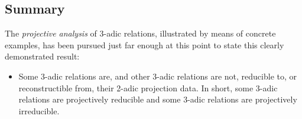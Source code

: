 \documentclass[12pt]{article}
\begin{document}
\subsection{Summary}

The \textit{projective analysis} of 3-adic relations, illustrated by means of concrete examples, has been pursued just far enough at this point to state this clearly demonstrated result:

\begin{itemize}
\item
Some 3-adic relations are, and other 3-adic relations are not, reducible to, or reconstructible from, their 2-adic projection data.  In short, some 3-adic relations are projectively reducible and some 3-adic relations are projectively irreducible.
\end{itemize}

\end{document}
